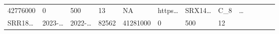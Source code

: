 \documentclass[
]{article}
\begin{document}
\begin{longtable}[]{@{}lllllllllllll@{}}
\begin{minipage}[t]{0.05\columnwidth}
42776000\strut
\end{minipage} & \begin{minipage}[t]{0.05\columnwidth}\raggedright
0\strut
\end{minipage} & \begin{minipage}[t]{0.05\columnwidth}\raggedright
500\strut
\end{minipage} & \begin{minipage}[t]{0.05\columnwidth}\raggedright
13\strut
\end{minipage} & \begin{minipage}[t]{0.05\columnwidth}\raggedright
NA\strut
\end{minipage} & \begin{minipage}[t]{0.05\columnwidth}\raggedright
https\ldots{}\strut
\end{minipage} & \begin{minipage}[t]{0.05\columnwidth}\raggedright
SRX14\ldots{}\strut
\end{minipage} & \begin{minipage}[t]{0.08\columnwidth}\raggedright
C\_8\strut
\end{minipage} & \begin{minipage}[t]{0.02\columnwidth}\raggedright
\ldots{}\strut
\end{minipage}\tabularnewline
\begin{minipage}[t]{0.05\columnwidth}\raggedright
SRR18\ldots{}\strut
\end{minipage} & \begin{minipage}[t]{0.05\columnwidth}\raggedright
2023-\ldots{}\strut
\end{minipage} & \begin{minipage}[t]{0.05\columnwidth}\raggedright
2022-\ldots{}\strut
\end{minipage} & \begin{minipage}[t]{0.04\columnwidth}\raggedright
82562\strut
\end{minipage} & \begin{minipage}[t]{0.05\columnwidth}\raggedright
41281000\strut
\end{minipage} & \begin{minipage}[t]{0.05\columnwidth}\raggedright
0\strut
\end{minipage} & \begin{minipage}[t]{0.05\columnwidth}\raggedright
500\strut
\end{minipage} & \begin{minipage}[t]{0.05\columnwidth}\raggedright
12\strut
\end{minipage} & \begin{minipage}[t]{0.05\columnwidth}\raggedright

\end{minipage}
\end{longtable}
\end{document}
